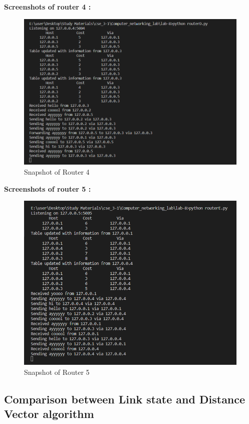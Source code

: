 \documentclass[11pt]{article}
\begin{document}
\textbf{Screenshots of router 4 : }\\[12pt]
 \begin{figure}[!h]
\centering
\includegraphics[width=\textwidth]{rD.png}
\caption{Snapshot of Router 4}
\end{figure}
\FloatBarrier

\textbf{Screenshots of router 5 : }\\[12pt]
 \begin{figure}[!h]
\centering
\includegraphics[width=\textwidth]{rE.png}
\caption{Snapshot of Router 5}
\end{figure}
\FloatBarrier


 \subsection{Comparison between Link state and Distance Vector algorithm}
 
\end{document}
